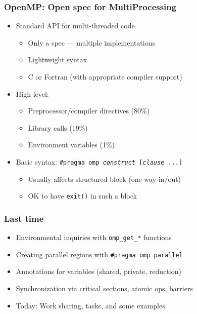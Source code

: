 \documentclass{beamer}
\begin{document}
\begin{frame}
  \titlepage
\end{frame}


\begin{frame}
  \frametitle{OpenMP: Open spec for MultiProcessing}

  \begin{itemize}
  \item Standard API for multi-threaded code
    \begin{itemize}
    \item Only a spec --- multiple implementations
    \item Lightweight syntax
    \item C or Fortran (with appropriate compiler support)
    \end{itemize}
  \item High level:
    \begin{itemize}
    \item Preprocessor/compiler directives (80\%)
    \item Library calls (19\%)
    \item Environment variables (1\%)
    \end{itemize}
  \item Basic syntax: {\tt \#pragma omp {\it construct} [{\it clause} ...]}
    \begin{itemize}
    \item Usually affects structured block (one way in/out)
    \item OK to have {\tt exit()} in such a block
    \end{itemize}
  \end{itemize}
\end{frame}


\begin{frame}
  \frametitle{Last time}

  \begin{itemize}
  \item Environmental inquiries with {\tt omp\_get\_*} functions
  \item Creating parallel regions with {\tt \#pragma omp parallel}
  \item Annotations for variables (shared, private, reduction)
  \item Synchronization via critical sections, atomic ops, barriers
  \item Today: Work sharing, tasks, and some examples
  \end{itemize}
\end{frame}
\end{document}
